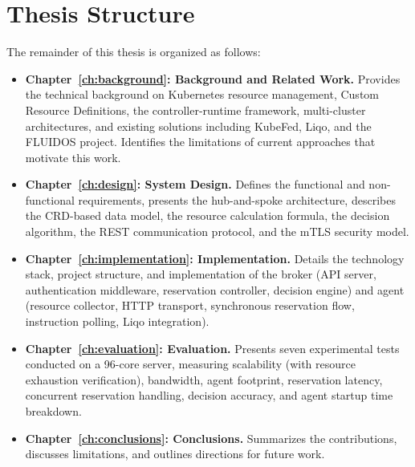 \section{Thesis Structure}
\label{sec:thesis-structure}

The remainder of this thesis is organized as follows:

\begin{itemize}
    \item \textbf{Chapter~\ref{ch:background}: Background and Related Work.} Provides the technical background on Kubernetes resource management, Custom Resource Definitions, the controller-runtime framework, multi-cluster architectures, and existing solutions including KubeFed, Liqo, and the FLUIDOS project. Identifies the limitations of current approaches that motivate this work.

    \item \textbf{Chapter~\ref{ch:design}: System Design.} Defines the functional and non-functional requirements, presents the hub-and-spoke architecture, describes the CRD-based data model, the resource calculation formula, the decision algorithm, the REST communication protocol, and the mTLS security model.

    \item \textbf{Chapter~\ref{ch:implementation}: Implementation.} Details the technology stack, project structure, and implementation of the broker (API server, authentication middleware, reservation controller, decision engine) and agent (resource collector, HTTP transport, synchronous reservation flow, instruction polling, Liqo integration).

    \item \textbf{Chapter~\ref{ch:evaluation}: Evaluation.} Presents seven experimental tests conducted on a 96-core server, measuring scalability (with resource exhaustion verification), bandwidth, agent footprint, reservation latency, concurrent reservation handling, decision accuracy, and agent startup time breakdown.

    \item \textbf{Chapter~\ref{ch:conclusions}: Conclusions.} Summarizes the contributions, discusses limitations, and outlines directions for future work.
\end{itemize}

